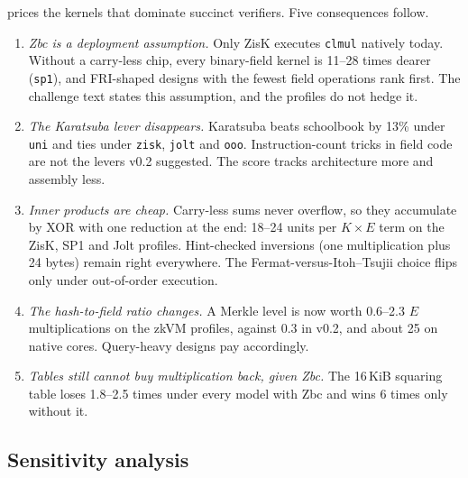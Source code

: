  prices the kernels that dominate succinct verifiers. Five consequences follow.
\begin{enumerate}[nosep]
\item \emph{Zbc is a deployment assumption.} Only ZisK executes \texttt{clmul} natively today. Without
  a carry-less chip, every binary-field kernel is 11--28 times dearer (\texttt{sp1}), and FRI-shaped
  designs with the fewest field operations rank first. The challenge text states this assumption, and
  the profiles do not hedge it.
\item \emph{The Karatsuba lever disappears.} Karatsuba beats schoolbook by 13\% under \texttt{uni} and
  ties under \texttt{zisk}, \texttt{jolt} and \texttt{ooo}. Instruction-count tricks in field code are
  not the levers v0.2 suggested. The score tracks architecture more and assembly less.
\item \emph{Inner products are cheap.} Carry-less sums never overflow, so they accumulate by XOR with
  one reduction at the end: 18--24 units per $K\times E$ term on the ZisK, SP1 and Jolt profiles. Hint-checked inversions
  (one multiplication plus 24 bytes) remain right everywhere. The Fermat-versus-Itoh--Tsujii choice
  flips only under out-of-order execution.
\item \emph{The hash-to-field ratio changes.} A Merkle level is now worth 0.6--2.3 $E$ multiplications on
  the zkVM profiles, against 0.3 in v0.2, and about 25 on native cores. Query-heavy designs pay
  accordingly.
\item \emph{Tables still cannot buy multiplication back, given Zbc.} The 16\,KiB squaring table loses
  1.8--2.5 times under every model with Zbc and wins 6 times only without it.
\end{enumerate}

\subsection{Sensitivity analysis}\label{subsec:cost-sensitivity}

